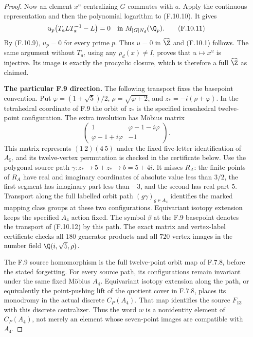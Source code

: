\begin{proof}
Now an element $x^u$ centralizing $G$ commutes with
$a$.  Apply the continuous representation and then
the polynomial logarithm to (F.10.10).  It gives
\[
                   u_p\bigl(T_aLT_a^{-1}-L\bigr)=0
                      \quad\hbox{in }M_{|G|N_d}(\Q_p).
                                                               \tag{F.10.11}
\]
By (F.10.9), $u_p=0$ for every prime $p$.
Thus $u=0$ in $\widehat\Z$ and (F.10.1) follows.
The same argument without $T_a$, using any
$\rho_d(x)\ne I$, proves that
$u\mapsto x^u$ is injective.  Its image is exactly
the procyclic closure, which is therefore a full
$\widehat\Z$ as claimed.

\textbf{The particular F.9 direction.}
The following transport fixes the basepoint convention.
Put $\varphi=(1+\sqrt5)/2$, $\rho=\sqrt{\varphi+2}$,
and $z_*=-i(\rho+\varphi)$.  In the tetrahedral coordinate
of F.9 the orbit of $z_*$ is the specified icosahedral
twelve-point configuration.  The extra involution has
M\"obius matrix
\[
 \begin{pmatrix}
  1&\varphi-1-i\varphi\\
  \varphi-1+i\varphi&-1
 \end{pmatrix}.                                         \tag{F.10.12}
\]
This matrix represents $(1\ 2)(4\ 5)$ under the
fixed five-letter identification of $A_5$, and its
twelve-vertex permutation is checked in the certificate
below.  Use the
polygonal source path
$\gamma:z_*\longrightarrow5+z_*\longrightarrow b=5+4i$.
It misses $R_A$: the finite points of $R_A$ have real
and imaginary coordinates of absolute value less than
$3/2$, the first segment has imaginary part less than
$-3$, and the second has real part $5$.
Transport along the full labelled orbit path
$(g\gamma)_{g\in A_4}$ identifies the marked mapping
class groups at these two configurations.  Equivariant
isotopy extension keeps the specified $A_4$ action
fixed.  The symbol $\beta$ at the F.9 basepoint denotes
the transport of (F.10.12) by this path.  The exact
matrix and vertex-label certificate
checks all $180$ generator products and all $720$
vertex images in the number field
$\Q(i,\sqrt5,\rho)$.

The F.9 source homomorphism is the full twelve-point
orbit map of F.7.8, before the stated forgetting.
For every source path, its configurations remain
invariant under the same fixed M\"obius $A_4$.
Equivariant isotopy extension along the path, or
equivalently the point-pushing lift of the quotient
cover in F.7.8, places its monodromy in the actual
discrete $C_P(A_4)$.  That map identifies the source
$F_{13}$ with this discrete centralizer.  Thus the
word $w$ is a nonidentity element of $C_P(A_4)$,
not merely an element whose seven-point images
are compatible with $A_4$.


\end{proof}
